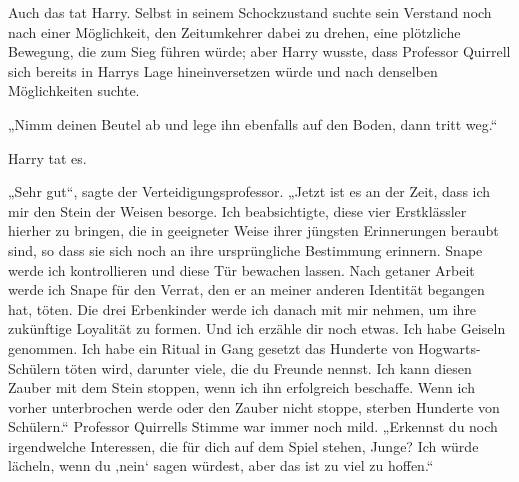 Auch das tat Harry. Selbst in seinem Schockzustand suchte sein Verstand noch nach einer Möglichkeit, den Zeitumkehrer dabei zu drehen, eine plötzliche Bewegung, die zum Sieg führen würde; aber Harry wusste, dass Professor Quirrell sich bereits in Harrys Lage hineinversetzen würde und nach denselben Möglichkeiten suchte.

„Nimm deinen Beutel ab und lege ihn ebenfalls auf den Boden, dann tritt weg.“

Harry tat es.

„Sehr gut“, sagte der Verteidigungsprofessor.
„Jetzt ist es an der Zeit, dass ich mir den Stein der Weisen besorge. Ich beabsichtigte, diese vier Erstklässler hierher zu bringen, die in geeigneter Weise ihrer jüngsten Erinnerungen beraubt sind, so dass sie sich noch an ihre ursprüngliche Bestimmung erinnern. Snape werde ich kontrollieren und diese Tür bewachen lassen. Nach getaner Arbeit werde ich Snape für den Verrat, den er an meiner anderen Identität begangen hat, töten. Die drei Erbenkinder werde ich danach mit mir nehmen, um ihre zukünftige Loyalität zu formen. Und ich erzähle dir noch etwas. Ich habe Geiseln genommen. Ich habe ein Ritual in Gang gesetzt das Hunderte von Hogwarts-Schülern töten wird, darunter viele, die du Freunde nennst. Ich kann diesen Zauber mit dem Stein stoppen, wenn ich ihn erfolgreich beschaffe. Wenn ich vorher unterbrochen werde oder den Zauber nicht stoppe, sterben Hunderte von Schülern.“ Professor Quirrells Stimme war immer noch mild.
„Erkennst du noch irgendwelche Interessen, die für dich auf dem Spiel stehen, Junge? Ich würde lächeln, wenn du ‚nein‘ sagen würdest, aber das ist zu viel zu hoffen.“

